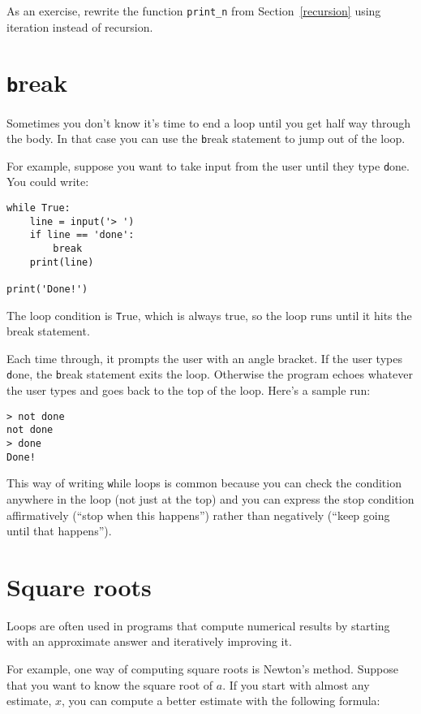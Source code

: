 \documentclass[
DIV=11,
fontsize=13,
twoside,
headinclude=false,
titlepage=firstiscover,
abstract=true,
headsepline=true,
footsepline=true,
chapterprefix=true, %
headings=big,
bibliography=totoc,%
captions=tableheading
]{scrbook}
\theoremstyle{definition}
\begin{document}
As an exercise, rewrite the function \verb"print_n" from
Section~\ref{recursion} using iteration instead of recursion.


\section{{\texttt break}}

Sometimes you don't know it's time to end a loop until you get half
way through the body.  In that case you can use the {\texttt break}
statement to jump out of the loop.

For example, suppose you want to take input from the user until they
type {\texttt done}.  You could write:

\begin{lstlisting}
while True:
    line = input('> ')
    if line == 'done':
        break
    print(line)

print('Done!')
\end{lstlisting}
%
The loop condition is {\texttt True}, which is always true, so the
loop runs until it hits the break statement.

Each time through, it prompts the user with an angle bracket.
If the user types {\texttt done}, the {\texttt break} statement exits
the loop.  Otherwise the program echoes whatever the user types
and goes back to the top of the loop.  Here's a sample run:

\begin{lstlisting}
> not done
not done
> done
Done!
\end{lstlisting}
%
This way of writing {\texttt while} loops is common because you
can check the condition anywhere in the loop (not just at the
top) and you can express the stop condition affirmatively
(``stop when this happens'') rather than negatively (``keep going
until that happens'').


\section{Square roots}
\label{squareroot}

Loops are often used in programs that compute
numerical results by starting with an approximate answer and
iteratively improving it.

For example, one way of computing square roots is Newton's method.
Suppose that you want to know the square root of $a$.  If you start
with almost any estimate, $x$, you can compute a better
estimate with the following formula:
\end{document}
